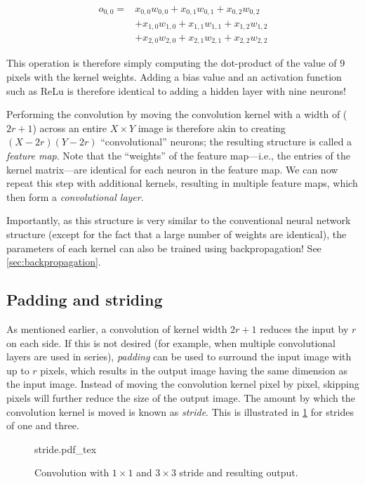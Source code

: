 \begin{eqnarray}
o_{0,0}=&x_{0,0}w_{0,0}+x_{0,1}w_{0,1}+x_{0,2}w_{0,2}\\
\nonumber
		&+x_{1,0}w_{1,0}+x_{1,1}w_{1,1}+x_{1,2}w_{1,2}\\
\nonumber
		&+x_{2,0}w_{2,0}+x_{2,1}w_{2,1}+x_{2,2}w_{2,2}
\end{eqnarray}

This operation is therefore simply computing the dot-product of the value of $9$ pixels with the kernel weights. Adding a bias value and an activation function such as ReLu is therefore identical to adding a hidden layer with nine neurons!

Performing the convolution by moving the convolution kernel with a width of ($2r+1$) across an entire $X\times Y$ image is therefore akin to creating $(X-2r)(Y-2r)$ ``convolutional'' neurons; the resulting structure is called a \textsl{feature map}.
Note that the ``weights'' of the feature map---i.e., the entries of the kernel matrix---are identical for each neuron in the feature map. We can now repeat this step with additional kernels, resulting in multiple feature maps, which then form a \textsl{convolutional layer}.

Importantly, as this structure is very similar to the conventional neural network structure (except for the fact that a large number of weights are identical), the parameters of each kernel can also be trained using backpropagation! See \cref{sec:backpropagation}.

\subsection{Padding and striding}

As mentioned earlier, a convolution of kernel width $2r+1$ reduces the input by $r$ on each side.
If this is not desired (for example, when multiple convolutional layers are used in series), \textsl{padding} can be used to surround the input image with up to $r$ pixels, which results in the output image having the same dimension as the input image. Instead of moving the convolution kernel pixel by pixel, skipping pixels will further reduce the size of the output image. The amount by which the convolution kernel is moved is known as \textsl{stride}. This is illustrated in \cref{fig:stride} for strides of one and three.

\begin{figure}[htb]
    \centering
    \def\svgwidth{0.8\textwidth}
    {stride.pdf_tex}
    \caption{Convolution with $1\times1$ and $3\times3$ stride and resulting output.\label{fig:stride}}
\end{figure}

